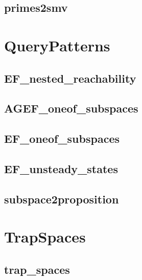 \documentclass[letterpaper,10pt,english]{sphinxmanual}
\begin{document}
\subsection{primes2smv}
\label{ModelChecking:id7}\label{ModelChecking:primes2smv}

\section{QueryPatterns}
\label{QueryPatterns:querypatterns}\label{QueryPatterns:networkx-has-path}\label{QueryPatterns::doc}\label{QueryPatterns:id1}

\subsection{EF\_nested\_reachability}
\label{QueryPatterns:ef-nested-reachability}

\subsection{AGEF\_oneof\_subspaces}
\label{QueryPatterns:agef-oneof-subspaces}

\subsection{EF\_oneof\_subspaces}
\label{QueryPatterns:ef-oneof-subspaces}

\subsection{EF\_unsteady\_states}
\label{QueryPatterns:ef-unsteady-states}

\subsection{subspace2proposition}
\label{QueryPatterns:subspace2proposition}

\section{TrapSpaces}
\label{TrapSpaces::doc}\label{TrapSpaces:trapspaces}\label{TrapSpaces:id1}

\subsection{trap\_spaces}
\label{TrapSpaces:id2}\label{TrapSpaces:trap-spaces}
\end{document}
